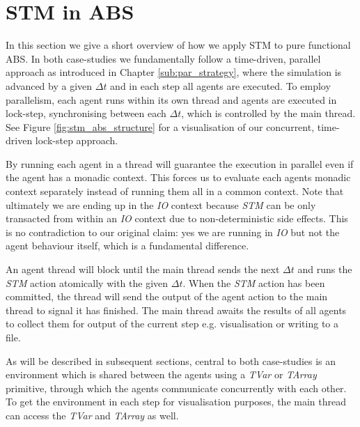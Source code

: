 \section{STM in ABS}
\label{sec:stm_abs}
In this section we give a short overview of how we apply STM to pure functional ABS. In both case-studies we fundamentally follow a time-driven, parallel approach as introduced in Chapter \ref{sub:par_strategy}, where the simulation is advanced by a given $\Delta t$ and in each step all agents are executed. To employ parallelism, each agent runs within its own thread and agents are executed in lock-step, synchronising between each $\Delta t$, which is controlled by the main thread. See Figure \ref{fig:stm_abs_structure} for a visualisation of our concurrent, time-driven lock-step approach.

By running each agent in a thread will guarantee the execution in parallel even if the agent has a monadic context. This forces us to evaluate each agents monadic context separately instead of running them all in a common context. Note that ultimately we are ending up in the \textit{IO} context because \textit{STM} can be only transacted from within an \textit{IO} context due to non-deterministic side effects. This is no contradiction to our original claim: yes we are running in \textit{IO} but not the agent behaviour itself, which is a fundamental difference.

An agent thread will block until the main thread sends the next $\Delta t$ and runs the \textit{STM} action atomically with the given $\Delta t$. When the \textit{STM} action has been committed, the thread will send the output of the agent action to the main thread to signal it has finished. The main thread awaits the results of all agents to collect them for output of the current step e.g. visualisation or writing to a file.

As will be described in subsequent sections, central to both case-studies is an environment which is shared between the agents using a \textit{TVar} or \textit{TArray} primitive, through which the agents communicate concurrently with each other. To get the environment in each step for visualisation purposes, the main thread can access the \textit{TVar} and \textit{TArray} as well. 

